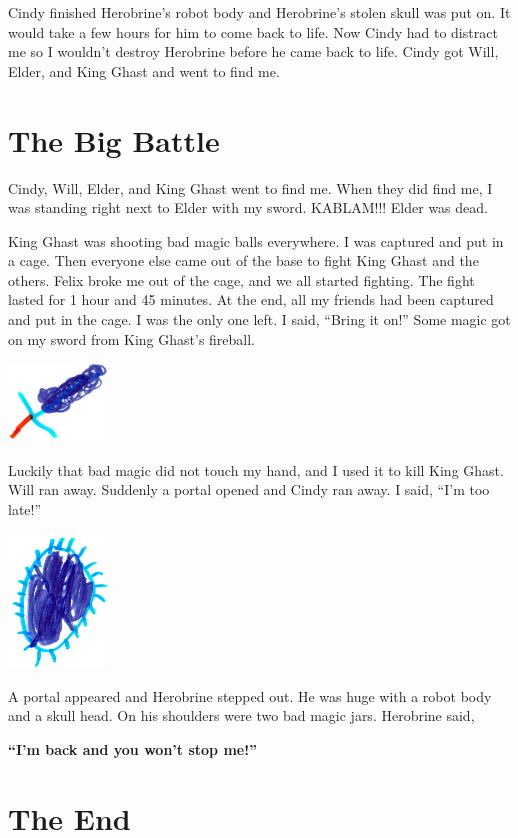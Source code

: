 \documentclass[oneside]{book}
\begin{document}
Cindy finished Herobrine's robot body and Herobrine's stolen skull was
put on. It would take a few hours for him to come back to life. Now
Cindy had to distract me so I wouldn't destroy Herobrine before he came
back to life. Cindy got Will, Elder, and King Ghast and went to find me.

\chapter{The Big Battle}\label{the-big-battle}

Cindy, Will, Elder, and King Ghast went to find me. When they did find
me, I was standing right next to Elder with my sword. KABLAM!!! Elder
was dead.

King Ghast was shooting bad magic balls everywhere. I was captured and
put in a cage. Then everyone else came out of the base to fight King
Ghast and the others. Felix broke me out of the cage, and we all started
fighting. The fight lasted for 1 hour and 45 minutes. At the end, all my
friends had been captured and put in the cage. I was the only one left.
I said, ``Bring it on!'' Some magic got on my sword from King Ghast's
fireball.

\includegraphics[width=1.04167in]{img/13-sword.jpg}

Luckily that bad magic did not touch my hand, and I used it to kill King
Ghast. Will ran away. Suddenly a portal opened and Cindy ran away. I
said, ``I'm too late!''

\includegraphics[width=1.04167in]{img/14-portal.jpg}

A portal appeared and Herobrine stepped out. He was huge with a robot
body and a skull head. On his shoulders were two bad magic jars.
Herobrine said,

\textbf{``I'm back and you won't stop me!''}

\chapter*{The End}\label{the-end}
\end{document}
